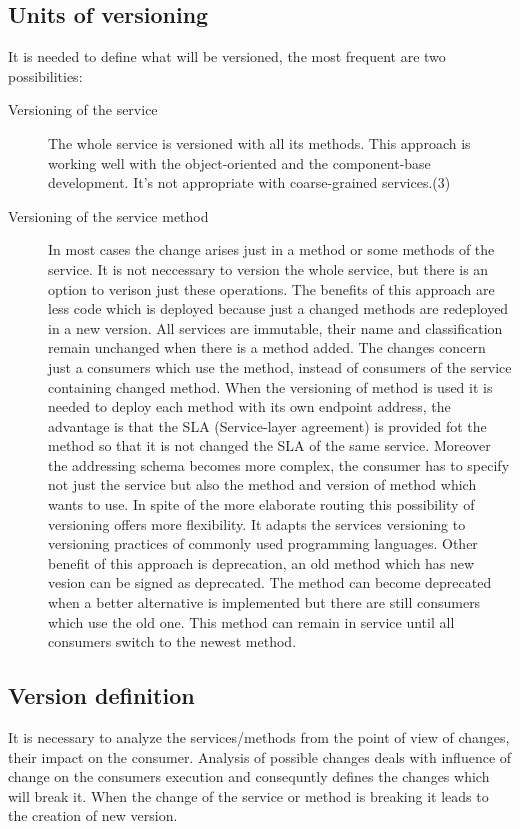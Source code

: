 \subsection{Units of versioning}
It is needed to define what will be versioned, the most frequent are two possibilities:

\begin{description}
  \item[Versioning of the service] 
  The whole service is versioned with all its methods. This approach is working well with the object-oriented and the component-base development. It's not appropriate with coarse-grained services.(3)
  \item[Versioning of the service method] 
  In most cases the change arises just in a method or some methods of the service. It is not neccessary to version the whole service, but there is an option to verison just these operations.
  The benefits of this approach are less code which is deployed because just a changed methods are redeployed in a new version. All services are immutable, their name and classification remain unchanged when there is a method added. The changes concern just a consumers which use the method, instead of consumers of the service containing changed method. 
  When the versioning of method is used it is needed to deploy each method with its own endpoint address, the advantage is that the SLA (Service-layer agreement) is provided fot the method so that it is not changed the SLA of the same service.
  Moreover the addressing schema becomes more complex, the consumer has to specify not just the service but also the method and version of method which wants to use.
In spite of the more elaborate routing this possibility of versioning offers more flexibility. It adapts the services versioning to versioning practices of commonly used programming languages. 
Other benefit of this approach is deprecation, an old method which has new vesion can be signed as deprecated. The method can become deprecated when a better alternative is implemented but there are still consumers which use the old one. This method can remain in service until all consumers switch to the newest method.
\end{description}

\subsection{Version definition}
It is necessary to analyze the services/methods from the point of view of changes, their impact on the consumer. Analysis of possible changes deals with influence of change on the consumers execution and consequntly defines the changes which will break it. When the change of the service or method is breaking it leads to the creation of new version.

